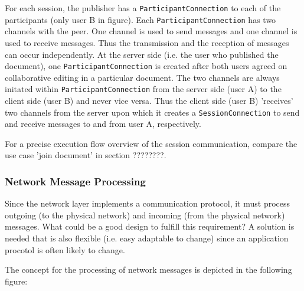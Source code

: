 For each session, the publisher has a \texttt{ParticipantConnection} to each of the participants (only user B in figure). Each \texttt{ParticipantConnection} has two channels with the peer. One channel is used to send messages and one channel is used to receive messages. Thus the transmission and the reception of messages can occur independently. At the server side (i.e. the user who published the document), one \texttt{ParticipantConnection} is created after both users agreed on collaborative editing in a particular document. The two channels are always initated within \texttt{ParticipantConnection} from the server side (user A) to the client side (user B) and never vice versa. Thus the client side (user B) 'receives' two channels from the server upon which it creates a \texttt{SessionConnection} to send and receive messages to and from user A, respectively.

For a precise execution flow overview of the session communication, compare the use case 'join document' in section ????????.


\subsubsection{Network Message Processing}
Since the network layer implements a communication protocol, it must process outgoing (to the physical network) and incoming (from the physical network) messages. What could be a good design to fulfill this requirement? A solution is needed that is also flexible (i.e. easy adaptable to change) since an application procotol is often likely to change.

The concept for the processing of network messages is depicted in the following figure:

